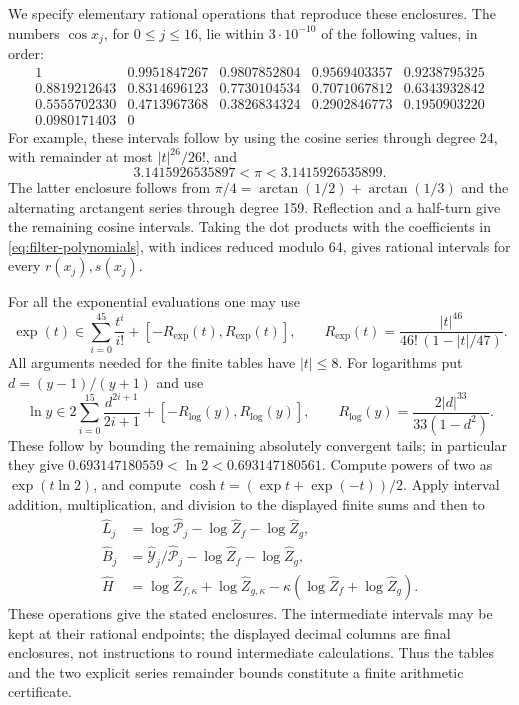 We specify elementary rational operations that reproduce these
enclosures.  The numbers $\cos x_j$, for $0\le j\le16$, lie within
$3\cdot10^{-10}$ of the following values, in order:
\[
\begin{array}{rrrrr}
1&0.9951847267&0.9807852804&0.9569403357&0.9238795325\\
0.8819212643&0.8314696123&0.7730104534&0.7071067812&0.6343932842\\
0.5555702330&0.4713967368&0.3826834324&0.2902846773&0.1950903220\\
0.0980171403&0
\end{array}
\]
For example, these intervals follow by using the cosine series through
degree 24, with remainder at most $|t|^{26}/26!$, and
\[
 3.1415926535897<\pi<3.1415926535899.
\]
The latter enclosure follows from
$\pi/4=\arctan(1/2)+\arctan(1/3)$ and the alternating arctangent
series through degree 159.  Reflection and a half-turn give the
remaining cosine intervals.  Taking the dot products with the
coefficients in \eqref{eq:filter-polynomials}, with indices reduced
modulo 64, gives rational intervals for every $r(x_j),s(x_j)$.

For all the exponential evaluations one may use
\begin{equation}\label{eq:certificate-exp}
 \exp(t)\in
 \sum_{i=0}^{45}\frac{t^i}{i!}
 +\left[-R_{\exp}(t),R_{\exp}(t)\right],\qquad
 R_{\exp}(t)=\frac{|t|^{46}}{46!\,(1-|t|/47)}.
\end{equation}
All arguments needed for the finite tables have $|t|\le8$.
For logarithms put $d=(y-1)/(y+1)$ and use
\begin{equation}\label{eq:certificate-log}
 \ln y\in
 2\sum_{i=0}^{15}\frac{d^{2i+1}}{2i+1}
 +\left[-R_{\log}(y),R_{\log}(y)\right],\qquad
 R_{\log}(y)=\frac{2|d|^{33}}{33(1-d^2)}.
\end{equation}
These follow by bounding the remaining absolutely convergent tails;
in particular they give
$0.693147180559<\ln2<0.693147180561$.
Compute powers of two as $\exp(t\ln2)$, and compute
$\cosh t=(\exp t+\exp(-t))/2$.
Apply interval addition, multiplication, and division to the displayed
finite sums and then to
\[
\begin{split}
 \widehat L_j&=\log\widehat{\mathcal P}_j
                    -\log\widehat Z_f-\log\widehat Z_g,\\
 \widehat B_j&=\widehat{\mathcal Y}_j/\widehat{\mathcal P}_j
                    -\log\widehat Z_f-\log\widehat Z_g,\\
 \widehat H&=\log\widehat Z_{f,\kappa}+\log\widehat Z_{g,\kappa}
                    -\kappa(\log\widehat Z_f+\log\widehat Z_g).
\end{split}
\]
These operations give the stated enclosures.  The intermediate
intervals may be kept at their rational endpoints; the displayed
decimal columns are final enclosures, not instructions to round
intermediate calculations.  Thus the tables and the two explicit
series remainder bounds constitute a finite arithmetic certificate.

